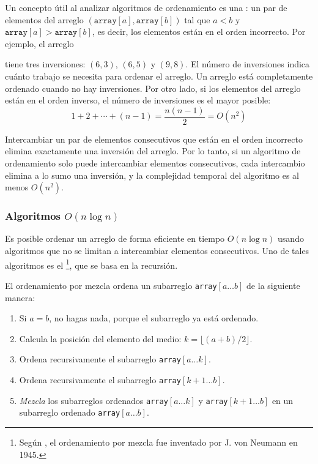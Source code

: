 Un concepto útil al analizar algoritmos
de ordenamiento es una :
un par de elementos del arreglo
$(\texttt{array}[a],\texttt{array}[b])$ tal que
$a<b$ y $\texttt{array}[a]>\texttt{array}[b]$,
es decir, los elementos están en el orden incorrecto.
Por ejemplo, el arreglo
\begin{center}
\end{center}
tiene tres inversiones: $(6,3)$, $(6,5)$ y $(9,8)$.
El número de inversiones indica
cuánto trabajo se necesita para ordenar el arreglo.
Un arreglo está completamente ordenado cuando
no hay inversiones.
Por otro lado, si los elementos del arreglo
están en el orden inverso,
el número de inversiones es el mayor posible:
\[1+2+\cdots+(n-1)=\frac{n(n-1)}{2} = O(n^2)\]

Intercambiar un par de elementos consecutivos que están
en el orden incorrecto elimina exactamente una inversión
del arreglo.
Por lo tanto, si un algoritmo de ordenamiento solo puede
intercambiar elementos consecutivos, cada intercambio elimina
a lo sumo una inversión, y la complejidad temporal
del algoritmo es al menos $O(n^2)$.

\subsubsection{Algoritmos $O(n \log n)$}


Es posible ordenar un arreglo de forma eficiente
en tiempo $O(n \log n)$ usando algoritmos
que no se limitan a intercambiar elementos consecutivos.
Uno de tales algoritmos es el \footnote{Según \cite{knu983},
el ordenamiento por mezcla fue inventado por J. von Neumann en 1945.},
que se basa en la recursión.

El ordenamiento por mezcla ordena un subarreglo \texttt{array}$[a \ldots b]$ de la siguiente manera:

\begin{enumerate}
\item Si $a=b$, no hagas nada, porque el subarreglo ya está ordenado.
\item Calcula la posición del elemento del medio: $k=\lfloor (a+b)/2 \rfloor$.
\item Ordena recursivamente el subarreglo \texttt{array}$[a \ldots k]$.
\item Ordena recursivamente el subarreglo \texttt{array}$[k+1 \ldots b]$.
\item \emph{Mezcla} los subarreglos ordenados \texttt{array}$[a \ldots k]$ y
\texttt{array}$[k+1 \ldots b]$
en un subarreglo ordenado \texttt{array}$[a \ldots b]$.
\end{enumerate}


